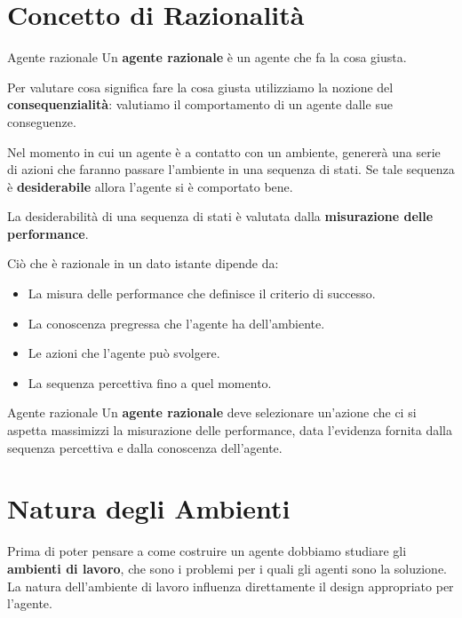 \section{Concetto di Razionalità}

\begin{definition-box}{Agente razionale}
Un \textbf{agente razionale} è un agente che fa la cosa giusta.
\end{definition-box}

Per valutare cosa significa fare la cosa giusta utilizziamo la nozione del
\textbf{consequenzialità}: valutiamo il comportamento di un agente dalle sue
conseguenze.

Nel momento in cui un agente è a contatto con un ambiente, genererà una serie
di azioni che faranno passare l'ambiente in una sequenza di stati. Se tale
sequenza è \textbf{desiderabile} allora l'agente si è comportato bene.

La desiderabilità di una sequenza di stati è valutata dalla
\textbf{misurazione delle performance}.

Ciò che è razionale in un dato istante dipende da:

\begin{itemize}
	\item La misura delle performance che definisce il criterio di successo.
	\item La conoscenza pregressa che l'agente ha dell'ambiente.
	\item Le azioni che l'agente può svolgere.
	\item La sequenza percettiva fino a quel momento.
\end{itemize}

\begin{definition-box}{Agente razionale}
Un \textbf{agente razionale} deve selezionare un'azione che ci si aspetta
massimizzi la misurazione delle performance, data l'evidenza fornita dalla
sequenza percettiva e dalla conoscenza dell'agente.
\end{definition-box}

\section{Natura degli Ambienti}

Prima di poter pensare a come costruire un agente dobbiamo studiare gli
\textbf{ambienti di lavoro}, che sono i problemi per i quali gli agenti sono la
soluzione. La natura dell'ambiente di lavoro influenza direttamente il design
appropriato per l'agente.

